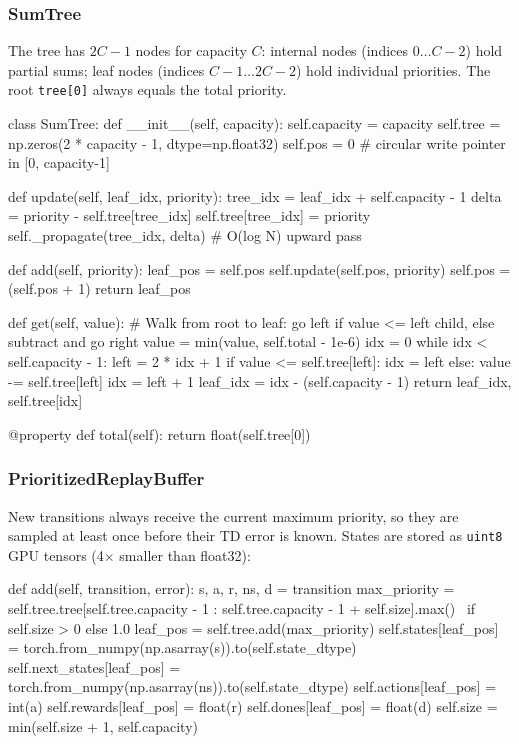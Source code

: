 \documentclass[12pt,a4paper]{report}
\begin{document}
\subsubsection*{SumTree}

The tree has $2C - 1$ nodes for capacity $C$:
internal nodes (indices $0 \ldots C-2$) hold partial sums;
leaf nodes (indices $C-1 \ldots 2C-2$) hold individual priorities.
The root \texttt{tree[0]} always equals the total priority.

\begin{pycode}
class SumTree:
    def __init__(self, capacity):
        self.capacity = capacity
        self.tree = np.zeros(2 * capacity - 1, dtype=np.float32)
        self.pos  = 0   # circular write pointer in [0, capacity-1]

    def update(self, leaf_idx, priority):
        tree_idx = leaf_idx + self.capacity - 1
        delta = priority - self.tree[tree_idx]
        self.tree[tree_idx] = priority
        self._propagate(tree_idx, delta)  # O(log N) upward pass

    def add(self, priority):
        leaf_pos = self.pos
        self.update(self.pos, priority)
        self.pos = (self.pos + 1) %
        return leaf_pos

    def get(self, value):
        # Walk from root to leaf: go left if value <= left child, else subtract and go right
        value = min(value, self.total - 1e-6)
        idx = 0
        while idx < self.capacity - 1:
            left = 2 * idx + 1
            if value <= self.tree[left]:
                idx = left
            else:
                value -= self.tree[left]
                idx = left + 1
        leaf_idx = idx - (self.capacity - 1)
        return leaf_idx, self.tree[idx]

    @property
    def total(self):
        return float(self.tree[0])
\end{pycode}

\newpage

\subsubsection*{PrioritizedReplayBuffer}

New transitions always receive the current maximum priority, so they are sampled at least
once before their TD error is known.
States are stored as \texttt{uint8} GPU tensors (4$\times$ smaller than float32):

\begin{pycode}
def add(self, transition, error):
    s, a, r, ns, d = transition
    max_priority = self.tree.tree[self.tree.capacity - 1 :
                                  self.tree.capacity - 1 + self.size].max() \
                   if self.size > 0 else 1.0
    leaf_pos = self.tree.add(max_priority)
    self.states[leaf_pos]      = torch.from_numpy(np.asarray(s)).to(self.state_dtype)
    self.next_states[leaf_pos] = torch.from_numpy(np.asarray(ns)).to(self.state_dtype)
    self.actions[leaf_pos]     = int(a)
    self.rewards[leaf_pos]     = float(r)
    self.dones[leaf_pos]       = float(d)
    self.size = min(self.size + 1, self.capacity)
\end{pycode}
\end{document}
